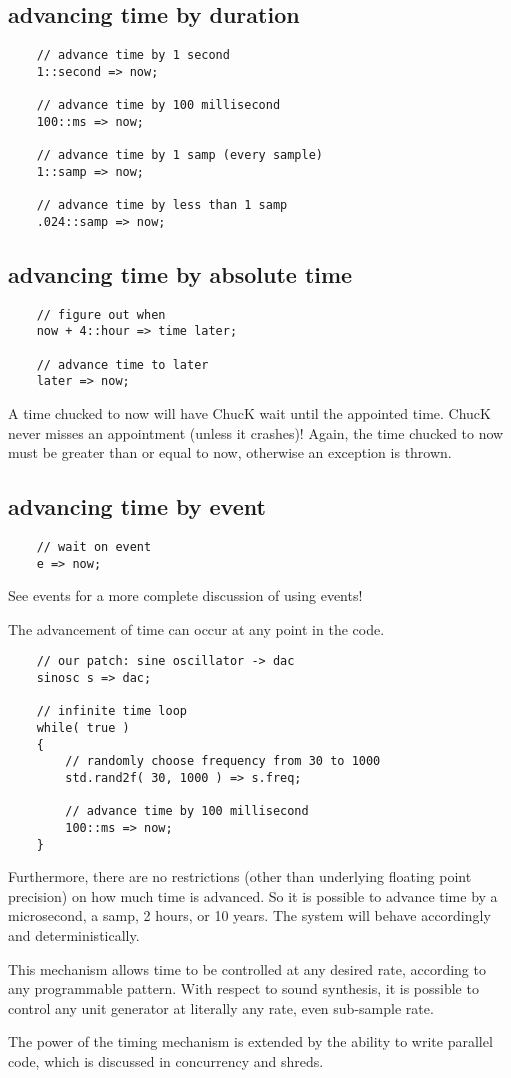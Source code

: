 \subsection{advancing time by duration}
\begin{verbatim}
    // advance time by 1 second
    1::second => now;

    // advance time by 100 millisecond
    100::ms => now;

    // advance time by 1 samp (every sample)
    1::samp => now;

    // advance time by less than 1 samp
    .024::samp => now;
\end{verbatim}

\subsection{advancing time by absolute time}

\begin{verbatim}
    // figure out when
    now + 4::hour => time later;

    // advance time to later
    later => now;
\end{verbatim}

A time chucked to now will have ChucK wait until the appointed time. ChucK never misses an appointment (unless it crashes)! Again, the time chucked to now must be greater than or equal to now, otherwise an exception is thrown.

\subsection{advancing time by event}
\begin{verbatim}
    // wait on event
    e => now;
\end{verbatim}

See events for a more complete discussion of using events!

The advancement of time can occur at any point in the code.
\begin{verbatim}
    // our patch: sine oscillator -> dac
    sinosc s => dac;

    // infinite time loop
    while( true )
    {
        // randomly choose frequency from 30 to 1000
        std.rand2f( 30, 1000 ) => s.freq;

        // advance time by 100 millisecond
        100::ms => now;
    }
\end{verbatim}

Furthermore, there are no restrictions (other than underlying floating point precision) on how much time is advanced. So it is possible to advance time by a microsecond, a samp, 2 hours, or 10 years. The system will behave accordingly and deterministically.

This mechanism allows time to be controlled at any desired rate, according to any programmable pattern. With respect to sound synthesis, it is possible to control any unit generator at literally any rate, even sub-sample rate.

The power of the timing mechanism is extended by the ability to write parallel code, which is discussed in concurrency and shreds.

